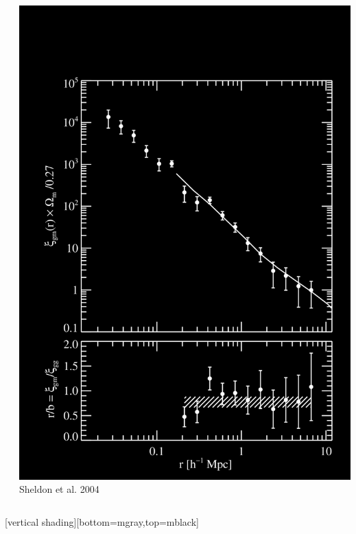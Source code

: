 \documentclass{beamer}
\begin{document}
{{\begin{columns}
\begin{column}{0.5\textwidth}
\begin{itemize}
                \end{itemize}
            \end{column}
            \begin{column}{0.5\textwidth}
                \begin{center}
                    \includegraphics[trim=100 10 20 250,clip,width=\textwidth]{xi_all_idit_bias_icolor.png}
                    \newline
                    {\color{gold}Sheldon et al. 2004}
                \end{center}
            \end{column}
        \end{columns}
    }

    [vertical shading][bottom=mgray,top=mblack]
}
\end{document}
